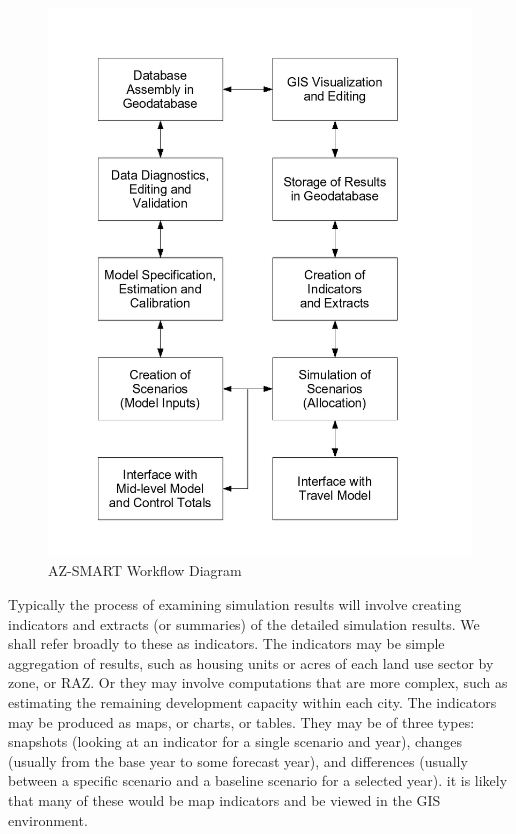 \begin{figure}[h]
\begin{center}
\includegraphics[scale=0.6]{figures/functional_diagram.png}
\caption{AZ-SMART Workflow Diagram} \label{figWorkflow}
\end{center}
\end{figure}


\clearpage

Typically the process of examining simulation results will involve creating indicators and extracts (or summaries) of the detailed
simulation results.  We shall refer broadly to these as indicators.  The indicators may be simple aggregation of results, such as
housing units or acres of each land use sector by zone, or RAZ.  Or they may involve computations that are more complex, such as
estimating the remaining development capacity within each city.  The indicators may be produced as maps, or charts, or tables.
They may be of three types: snapshots (looking at an indicator for a single scenario and year), changes (usually from the base year
to some forecast year), and differences (usually between a specific scenario and a baseline scenario for a selected year).  it is
likely that many of these would be map indicators and be viewed in the GIS environment.



